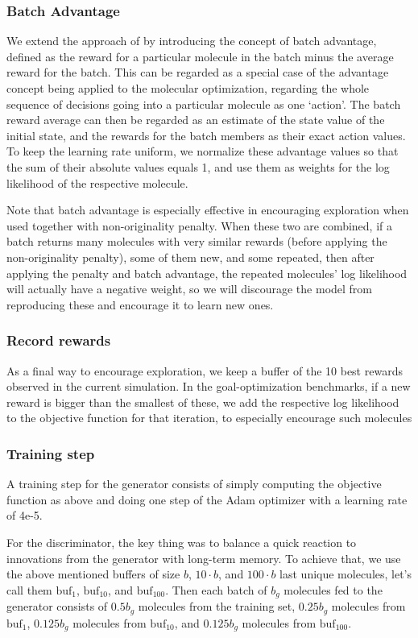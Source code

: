 \documentclass{article}
\newcommand{\buf}{\ensuremath{\text{buf}}}
\begin{document}
\subsubsection{Batch Advantage}
We extend the approach of \cite{segler2017} by introducing the concept of batch advantage, defined as the reward for a particular molecule in the batch minus the average reward for the batch. This can be regarded as a special case of the advantage concept being applied to the molecular optimization, regarding the whole sequence of decisions going into a particular molecule as one `action'. The batch reward average can then be regarded as an estimate of the state value of the initial state, and the rewards for the batch members as their exact action values. To keep the learning rate uniform, we normalize these advantage values so that the sum of their absolute values equals 1, and use them as weights for the log likelihood of the respective molecule.

Note that batch advantage is especially effective in encouraging exploration when used together with non-originality penalty. When these two are combined, if a batch returns many molecules with very similar rewards (before applying the non-originality penalty), some of them new, and some repeated, then after applying the penalty and batch advantage, the repeated molecules' log likelihood will actually have a negative weight, so we will discourage the model from reproducing these and encourage it to learn new ones.
\subsubsection{Record rewards}
As a final way to encourage exploration, we keep a buffer of the 10 best rewards observed in the current simulation. In the goal-optimization benchmarks, if a new reward is bigger than the smallest of these, we add the respective log likelihood to the objective function for that iteration, to especially encourage such molecules
\subsubsection{Training step}
A training step for the generator consists of simply computing the objective function as above and doing one step of the Adam optimizer with a learning rate of 4e-5.

For the discriminator, the key thing was to balance a quick reaction to innovations from the generator with long-term memory. To achieve that, we use the above mentioned buffers of size $b$, $10\cdot b$, and $100\cdot b$ last unique molecules, let's call them $\buf_1$, $\buf_{10}$, and $\buf_{100}$. Then each batch of $b_g$ molecules fed to the generator consists of $0.5 b_g$ molecules from the training set, $0.25 b_g$ molecules from $\buf_1$,  $0.125 b_g$ molecules from $\buf_{10}$, and  $0.125 b_g$ molecules from $\buf_{100}$. 
\end{document}
